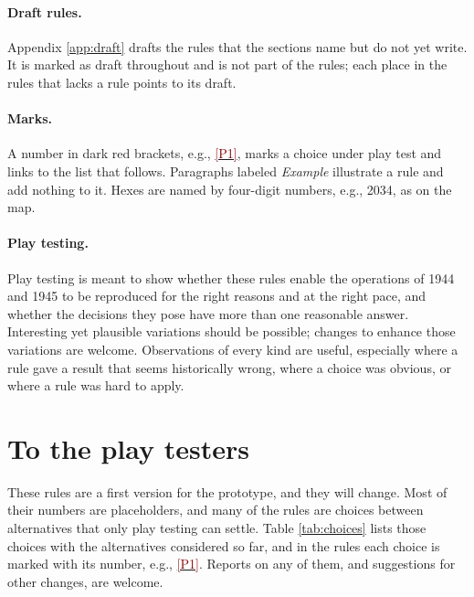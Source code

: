 \documentclass[11pt]{article}
\newcommand{\ptest}[1]{\hyperlink{ptest}{\textcolor{darkred}{[P#1]}}}
\begin{document}
\paragraph{Draft rules.} Appendix \ref{app:draft} drafts the rules that the sections name but do not yet write. It is marked as draft throughout and is not part of the rules; each place in the rules that lacks a rule points to its draft.

\paragraph{Marks.} A number in dark red brackets, e.g., \ptest{1}, marks a choice under play test and links to the list that follows. Paragraphs labeled \emph{Example} illustrate a rule and add nothing to it. Hexes are named by four-digit numbers, e.g., 2034, as on the map.

\paragraph{Play testing.} Play testing is meant to show whether these rules enable the operations of 1944 and 1945 to be reproduced for the right reasons and at the right pace, and whether the decisions they pose have more than one reasonable answer. Interesting yet plausible variations should be possible; changes to enhance those variations are welcome. Observations of every kind are useful, especially where a rule gave a result that seems historically wrong, where a choice was obvious, or where a rule was hard to apply.
\clearpage

\section*{To the play testers}
\hypertarget{ptest}{}\label{sec:playtest}
These rules are a first version for the prototype, and they will change. Most of their numbers are placeholders, and many of the rules are choices between alternatives that only play testing can settle. Table \ref{tab:choices} lists those choices with the alternatives considered so far, and in the rules each choice is marked with its number, e.g., \ptest{1}. Reports on any of them, and suggestions for other changes, are welcome.
\end{document}
